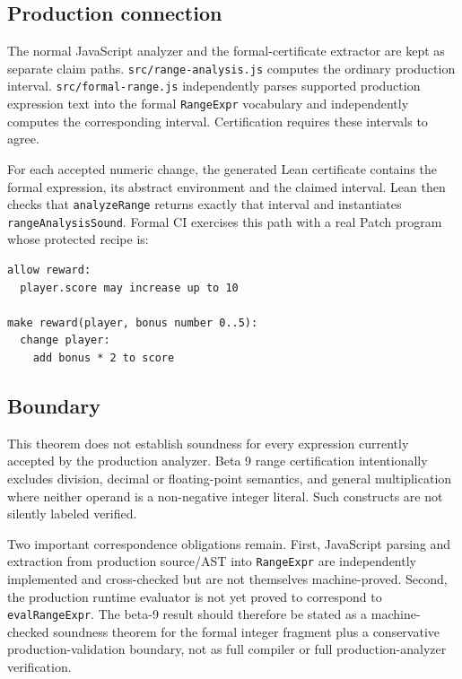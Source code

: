 \subsection{Production connection}
The normal JavaScript analyzer and the formal-certificate extractor are kept as
separate claim paths. \texttt{src/range-analysis.js} computes the ordinary
production interval. \texttt{src/formal-range.js} independently parses supported
production expression text into the formal \texttt{RangeExpr} vocabulary and
independently computes the corresponding interval. Certification requires these
intervals to agree.

For each accepted numeric change, the generated Lean certificate contains the
formal expression, its abstract environment and the claimed interval. Lean then
checks that \texttt{analyzeRange} returns exactly that interval and instantiates
\texttt{rangeAnalysisSound}. Formal CI exercises this path with a real Patch
program whose protected recipe is:

\begin{lstlisting}
allow reward:
  player.score may increase up to 10

make reward(player, bonus number 0..5):
  change player:
    add bonus * 2 to score
\end{lstlisting}

\subsection{Boundary}
This theorem does not establish soundness for every expression currently
accepted by the production analyzer. Beta 9 range certification intentionally
excludes division, decimal or floating-point semantics, and general
multiplication where neither operand is a non-negative integer literal. Such
constructs are not silently labeled verified.

Two important correspondence obligations remain. First, JavaScript parsing and
extraction from production source/AST into \texttt{RangeExpr} are independently
implemented and cross-checked but are not themselves machine-proved. Second,
the production runtime evaluator is not yet proved to correspond to
\texttt{evalRangeExpr}. The beta-9 result should therefore be stated as a
machine-checked soundness theorem for the formal integer fragment plus a
conservative production-validation boundary, not as full compiler or full
production-analyzer verification.
